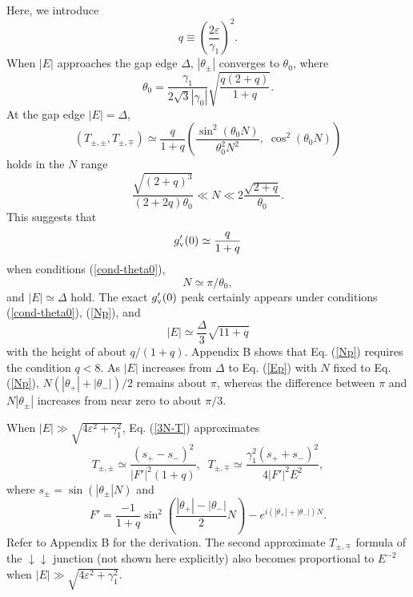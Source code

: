 \documentclass{jpsj3}
\begin{document}
Here, we introduce
\begin{equation}
q \equiv \left(\frac{2\varepsilon}{\gamma_1} \right)^2.
\label{q-theta}
\end{equation}
When $|E|$ approaches the gap edge $\Delta$,
$|\theta_\pm|$ converges to $\theta_0$, where
\begin{equation}
\theta_0 =
\frac{\gamma_1 }{2\sqrt{3}|\gamma_0|}\sqrt{\frac{q(2+q)}{1+q}}.
\label{theta0}
\end{equation}
At the gap edge $|E|=\Delta$, 
\begin{equation}
\left(
T_{\pm,\pm}, T_{\pm,\mp}
\right)
\simeq
\frac{q}{1+q}
\left(\frac{\sin^2(\theta_0N)}{\theta_0^2N^2},\;\cos^2(\theta_0N)
\right)
\label{3N-T-2}
\end{equation}
holds in the $N$ range
\begin{equation}
\frac{\sqrt{(2+q)^3}}{(2+2q) \theta_0} \ll
N \ll 2\frac{\sqrt{2+q}}{ \theta_0}.
\label{cond-theta0}
\end{equation}
This suggests that 
\begin{equation}
g'_{\rm v}(0)
\simeq \frac{q}{1+q} 
\label{tuika-q} 
\end{equation}
when conditions (\ref{cond-theta0}),
\begin{equation}
N \simeq \pi/\theta_0,
\label{Np}
\end{equation}
and $|E| \simeq \Delta$ 
hold. The exact $g'_{\rm v}(0)$ peak
certainly appears under conditions (\ref{cond-theta0}), (\ref{Np}), and
\begin{equation}
|E| \simeq \frac{\Delta}{3}\sqrt{11+q}
\label{Ep}
\end{equation}
with the height of about $q/(1+q)$. 
Appendix B shows that Eq. (\ref{Np})
requires the condition $q<8$.
As $|E|$ increases from $\Delta$ to Eq. (\ref{Ep})
with $N$ fixed to Eq. (\ref{Np}),
$N(|\theta_+|+|\theta_-|)/2$ remains about $\pi$,  whereas
 the difference between $\pi$ and $N|\theta_{\pm}|$ 
increases from near zero to about $\pi/3$.

When $|E| \gg \sqrt{4\varepsilon^2+\gamma_1^2}$, 
Eq. (\ref{3N-T}) approximates
\begin{equation}
T_{\pm,\pm}
\simeq
\frac{(s_+ - s_-)^2}{\left|F'\right|^2 (1+q)}
,\;\;
T_{\pm,\mp}
\simeq
\frac{\gamma_1^2(s_++s_-)^2}
{4 \left|F'\right|^2 E^2},
\label{3N-T-3}
\end{equation}
where $s_\pm = \sin(|\theta_{\pm}|N)$ and
\begin{equation}
F' =\frac{-1}{1+q}\sin^2\left( 
\frac{|\theta_+|-|\theta_-|}{2} N 
\right)
-e^{i(|\theta_+|+|\theta_-|)N}.
\end{equation}
Refer to Appendix B for the derivation.
The second approximate $T_{\pm,\mp}$ formula of the $\downarrow\downarrow$ junction (not shown here explicitly) also becomes proportional to $E^{-2}$ when $|E| \gg \sqrt{4\varepsilon^2+\gamma_1^2}$.
\end{document}
